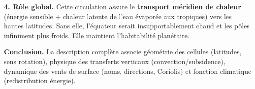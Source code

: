 \documentclass[11pt]{article}
\begin{document}
\begin{exoresolu}
\textbf{4. Rôle global.}
Cette circulation assure le \textbf{transport méridien de chaleur} (énergie sensible + chaleur latente de l'eau évaporée aux tropiques) vers les hautes latitudes. Sans elle, l'équateur serait insupportablement chaud et les pôles infiniment plus froids. Elle maintient l'habitabilité planétaire.

\textbf{Conclusion.} La description complète associe géométrie des cellules (latitudes, sens rotation), physique des transferts verticaux (convection/subsidence), dynamique des vents de surface (noms, directions, Coriolis) et fonction climatique (redistribution énergie).
\end{exoresolu}

\end{document}
